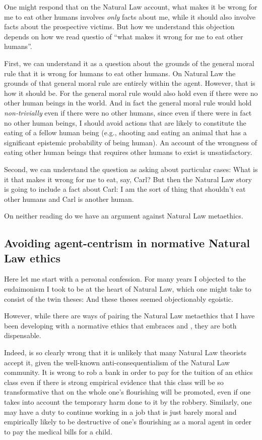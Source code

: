 One might respond that on the Natural Law account, what makes it be wrong for me to eat other humans involves \textit{only} facts
about me, while it should also involve facts about the prospective victims. But how we understand this objection depends on how 
we read questio of ``what makes it wrong for me to eat other humans''. 

First, we can understand it as a question about the grounds of 
the general moral rule that it is wrong for humans to eat other humans. On Natural Law the grounds of that general moral rule 
are entirely within the agent. However, that is how it should be. For the general moral rule would also hold even if there were
no other human beings in the world. And in fact the general moral rule would hold \textit{non-trivially} even if there were no
other humans, since even if there were in fact no other human beings, I should avoid actions that are likely to constitute the eating
of a fellow human being (e.g., shooting and eating an animal that has a significant epistemic probability of being human). 
An account of the wrongness of eating other human beings that requires other humans to exist is unsatisfactory.

Second, we can understand the question as asking about particular cases: What is it that makes it wrong for me to eat, say, Carl?
But then the Natural Law story is going to include a fact about Carl: I am the sort of thing that shouldn't eat other humans 
and Carl is another human. 

On neither reading do we have an argument against Natural Law metaethics.

\subsection{Avoiding agent-centrism in normative Natural Law ethics}
Here let me start with a personal confession. For many years I objected to the eudaimonism I took to be at the heart of Natural
Law, which one might take to consist of the twin theses:
And these theses seemed objectionably egoistic.

However, while there are ways of pairing the Natural Law metaethics that I have been developing with a normative ethics
that embraces  and , they are both dispensable. 

Indeed,  is so clearly wrong that it is unlikely that many Natural Law theorists accept it, given the 
well-known anti-consequentialism of the Natural Law community. It is wrong
to rob a bank in order to pay for the tuition of an ethics class even if there is strong empirical evidence that this 
class will be so transformative that on the whole one's flourishing will be promoted, even if one takes into account the
temporary harm done to it by the robbery. Similarly, one may have a duty to continue working in a job that is just barely
moral and empirically likely to be destructive of one's flourishing as a moral agent in order to pay the medical bills 
for a child. 

